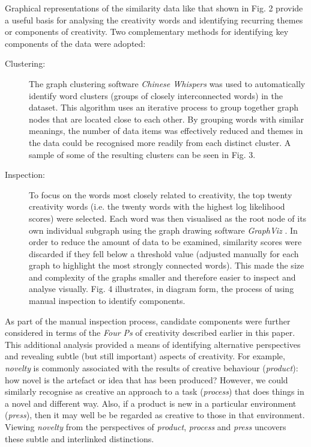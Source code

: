 \documentclass[10pt,letterpaper]{article}
\begin{document}
  

Graphical representations of the similarity data like that shown in Fig. 2 %
provide a useful basis for analysing the creativity words and identifying recurring themes or components of creativity. Two complementary methods for identifying key components of the data were adopted:






\begin{description}

\item[Clustering:] The graph clustering software {\em Chinese Whispers} \cite{biemann06} was used to automatically identify word clusters (groups of closely interconnected words) in the dataset. This algorithm uses an iterative process to group together graph nodes that are located close to each other. By grouping words with similar meanings, the number of data items was effectively reduced and themes in the data could be recognised more readily from each distinct cluster. A sample of some of the resulting clusters can be seen in Fig. 3. %

\item[Inspection:] To focus on the words most closely related to creativity, the top twenty creativity words (i.e. the twenty  words with the highest log likelihood scores) were selected. Each word was then visualised as the root node of its own individual subgraph using the graph drawing software {\em GraphViz} \cite{graphviz}. In order to reduce the amount of data to be examined, similarity scores were discarded if they fell below a threshold value (adjusted manually for each graph to highlight the most strongly connected words). This made the size and complexity of the graphs smaller and therefore easier to inspect and analyse visually. Fig. 4 %
illustrates, in diagram form, the process of using manual inspection to identify components. 

\end{description}




As part of the manual inspection process, candidate components were further considered in terms of the {\em Four Ps} of creativity \cite{rhodes61,mooney63,mackinnon70,kaufman09} described earlier in this paper. This additional analysis provided a means of identifying alternative perspectives and revealing subtle (but still important) aspects of creativity.  For example, {\em novelty} is commonly associated with the results of creative behaviour ({\em product\/}): how novel is the artefact or idea that has been produced? However, we could similarly recognise as creative an approach to a task  ({\em process\/}) that does things in a novel and different way.  Also, if a product is new in a particular environment ({\em press\/}), then it may well be be regarded as creative to those in that environment. Viewing {\em novelty} from the perspectives of {\em product}, {\em process} and {\em press} uncovers these subtle and interlinked distinctions.
\end{document}
